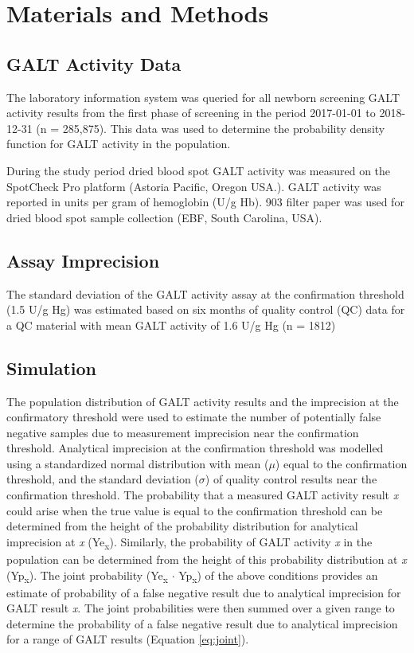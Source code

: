 \documentclass[review]{elsarticle}
\begin{document}
\section*{Materials and Methods}
\label{sec:orgf3cca20}
\subsection*{GALT Activity Data}
\label{sec:org137679d}
The laboratory information system was queried for all newborn
screening GALT activity results from the first phase of screening in
the period 2017-01-01 to 2018-12-31 (n = 285,875). This data was used
to determine the probability density function for GALT activity in the
population.

During the study period dried blood spot GALT activity was measured
on the SpotCheck Pro platform (Astoria Pacific, Oregon USA.). GALT
activity was reported in units per gram of hemoglobin (U/g Hb). 903
filter paper was used for dried blood spot sample collection (EBF,
South Carolina, USA).

\subsection*{Assay Imprecision}
\label{sec:org1418fba}
The standard deviation of the GALT activity assay at the confirmation
threshold (1.5 U/g Hg) was estimated based on six months of quality
control (QC) data for a QC material with mean GALT activity of 1.6 U/g
Hg (n = 1812)

\subsection*{Simulation}
\label{sec:org03bd4fd}
The population distribution of GALT activity results and the
imprecision at the confirmatory threshold were used to estimate the
number of potentially false negative samples due to measurement
imprecision near the confirmation threshold. Analytical imprecision at
the confirmation threshold was modelled using a standardized normal
distribution with mean (\(\mu\)) equal to the confirmation threshold, and
the standard deviation (\(\sigma\)) of quality control results near the
confirmation threshold. The probability that a measured GALT activity
result \emph{x} could arise when the true value is equal to the confirmation
threshold can be determined from the height of the probability
distribution for analytical imprecision at \emph{x} (Ye\textsubscript{x}). Similarly, the
probability of GALT activity \emph{x} in the population can be determined
from the height of this probability distribution at \emph{x} (Yp\textsubscript{x}). The
joint probability (Ye\textsubscript{x} \(\cdot\) Yp\textsubscript{x}) of the above conditions provides
an estimate of probability of a false negative result due to analytical
imprecision for GALT result \emph{x}. The joint probabilities were then
summed over a given range to determine the probability of a false
negative result due to analytical imprecision for a range of GALT
results (Equation \ref{eq:joint}).
\end{document}
